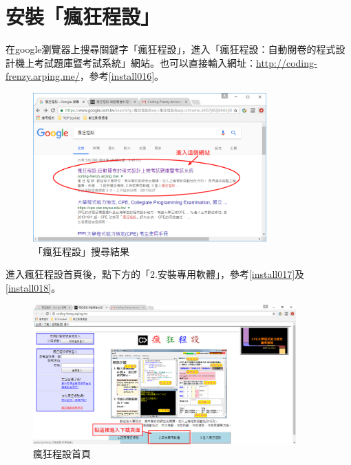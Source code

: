 \section{安裝「瘋狂程設」}
在google瀏覽器上搜尋關鍵字「瘋狂程設」，進入「瘋狂程設：自動閱卷的程式設計機上考試題庫暨考試系統」網站。也可以直接輸入網址：\url{http://coding-frenzy.arping.me/}，參考\autoref{install016}。
		\begin{figure}[H]
			\centering
			\includegraphics[width=0.8\textwidth]{fig/install_and_setting/install_016}
			\caption{「瘋狂程設」搜尋結果}
			\label{install016}
		\end{figure}
		進入瘋狂程設首頁後，點下方的「2.安裝專用軟體」，參考\autoref{install017}及\autoref{install018}。
		\begin{figure}[H]
			\centering
			\includegraphics[width=0.9\textwidth]{fig/install_and_setting/install_017}
			\caption{瘋狂程設首頁}
			\label{install017}
		\end{figure}
		
